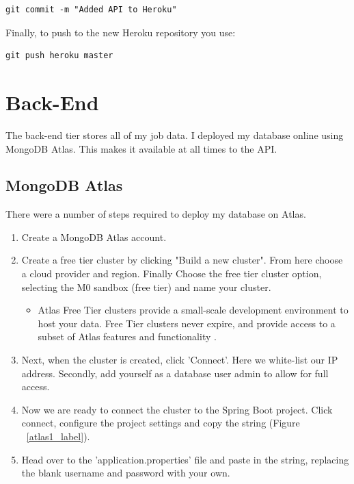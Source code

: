 \begin{verbatim}
git commit -m "Added API to Heroku"
\end{verbatim}
Finally, to push to the new Heroku repository you use:

\begin{verbatim}
git push heroku master
\end{verbatim}

\section{Back-End}
The back-end tier stores all of my job data. I deployed my database online using MongoDB Atlas. This makes it available at all times to the API.

\subsection{MongoDB Atlas}
There were a number of steps required to deploy my database on Atlas.

\begin{enumerate}
    \item Create a MongoDB Atlas account.
    \item Create a free tier cluster by clicking "Build a new cluster". From here choose a cloud provider and region. Finally Choose the free tier cluster option, selecting the M0 sandbox (free tier) and name your cluster.
    \begin{itemize}
        \item Atlas Free Tier clusters provide a small-scale development environment to host your data. Free Tier clusters never expire, and provide access to a subset of Atlas features and functionality \cite{Atlas}.
    \end{itemize}
    \item Next, when the cluster is created, click 'Connect'. Here we white-list our IP address. Secondly, add yourself as a database user admin to allow for full access.
    \item Now we are ready to connect the cluster to the Spring Boot project. Click connect, configure the project settings and copy the string (Figure ~\ref{atlas1_label}).
    \item Head over to the 'application.properties' file and paste in the string, replacing the blank username and password with your own.
\end{enumerate}

